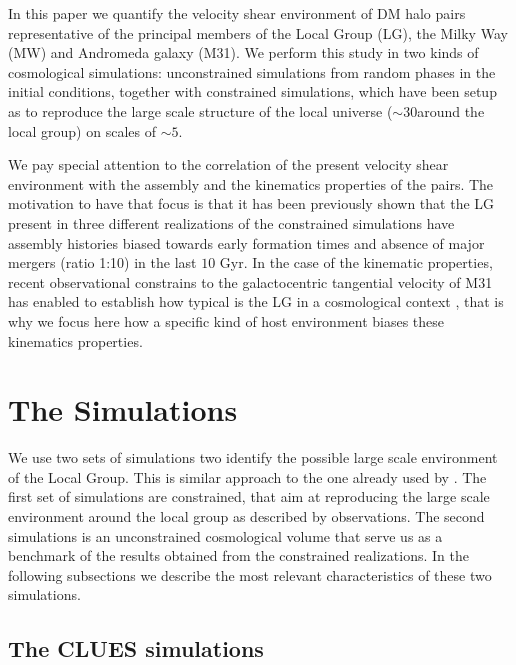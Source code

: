 \documentclass[usenatbib]{latex/mn2e}
\begin{document}
In this paper we quantify the velocity shear environment of DM halo pairs
representative of the principal members of the Local Group (LG), the Milky 
Way (MW) and Andromeda galaxy (M31). We perform this study in two kinds of 
cosmological simulations: unconstrained simulations from random phases in 
the initial conditions, together with constrained simulations, which have 
been setup as to reproduce the large scale structure of the local universe
($\sim 30$\hMpc around the local group) on scales of $\sim 5$\hMpc. 


We pay special attention to the correlation of the present velocity shear 
environment with the assembly and the kinematics properties of the pairs. 
The motivation to have that focus is that it has been previously shown that 
the LG present in three different realizations of the constrained simulations 
have assembly histories biased towards early formation times and absence of 
major mergers (ratio 1:10) in the last $10$ Gyr. In the case of the kinematic
properties, recent observational constrains to the galactocentric tangential 
velocity of M31 has enabled to establish how typical is the LG in a 
cosmological context , that is why
we focus here how a specific kind of host environment biases these kinematics
properties.


\section{The Simulations}
\label{sec:the_simulations}


We use two sets of simulations two identify the possible large scale 
environment of the Local Group. This is similar approach to the one 
already used by . The first set of simulations are 
constrained, that aim at reproducing the large scale environment around the 
local group as described by observations. The second simulations is an 
unconstrained cosmological volume that serve us as a benchmark of the results 
obtained from the constrained realizations. In the following subsections we 
describe the most relevant characteristics of these two simulations.


\subsection{The CLUES simulations}
\label{subsec:CLUES_simulations}
\end{document}
